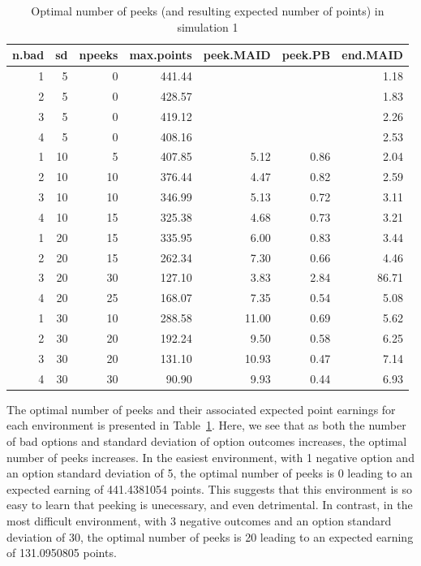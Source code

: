 \documentclass[a4paper,doc,natbib,floatsintext]{apa6}\usepackage[]{graphicx}\usepackage[]{color}
\begin{document}
\begin{table}[ht]
\centering
\begin{tabular}{rrrrrrr}
  \hline
n.bad & sd & npeeks & max.points & peek.MAID & peek.PB & end.MAID \\ 
  \hline
  1 &   5 &   0 & 441.44 &  &  & 1.18 \\ 
    2 &   5 &   0 & 428.57 &  &  & 1.83 \\ 
    3 &   5 &   0 & 419.12 &  &  & 2.26 \\ 
    4 &   5 &   0 & 408.16 &  &  & 2.53 \\ 
    1 &  10 &   5 & 407.85 & 5.12 & 0.86 & 2.04 \\ 
    2 &  10 &  10 & 376.44 & 4.47 & 0.82 & 2.59 \\ 
    3 &  10 &  10 & 346.99 & 5.13 & 0.72 & 3.11 \\ 
    4 &  10 &  15 & 325.38 & 4.68 & 0.73 & 3.21 \\ 
    1 &  20 &  15 & 335.95 & 6.00 & 0.83 & 3.44 \\ 
    2 &  20 &  15 & 262.34 & 7.30 & 0.66 & 4.46 \\ 
    3 &  20 &  30 & 127.10 & 3.83 & 2.84 & 86.71 \\ 
    4 &  20 &  25 & 168.07 & 7.35 & 0.54 & 5.08 \\ 
    1 &  30 &  10 & 288.58 & 11.00 & 0.69 & 5.62 \\ 
    2 &  30 &  20 & 192.24 & 9.50 & 0.58 & 6.25 \\ 
    3 &  30 &  20 & 131.10 & 10.93 & 0.47 & 7.14 \\ 
    4 &  30 &  30 & 90.90 & 9.93 & 0.44 & 6.93 \\ 
   \hline
\end{tabular}
\caption{Optimal number of peeks (and resulting expected number of points) in simulation 1} 
\label{table:optimalsim1}
\end{table}


The optimal number of peeks and their associated expected point earnings for each environment is presented in Table~\ref{table:optimalsim1}. Here, we see that as both the number of bad options and standard deviation of option outcomes increases, the optimal number of peeks increases. In the easiest environment, with 1 negative option and an option standard deviation of 5, the optimal number of peeks is 0 leading to an expected earning of 441.4381054 points. This suggests that this environment is so easy to learn that peeking is unecessary, and even detrimental. In contrast, in the most difficult environment, with 3 negative outcomes and an option standard deviation of 30, the optimal number of peeks is 20 leading to an expected earning of 131.0950805 points.
\end{document}
